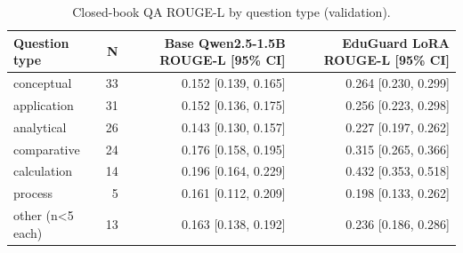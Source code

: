 \begin{table}[t]
\centering
\caption{Closed-book QA ROUGE-L by question type (validation).}
\label{tab:t6_qa_by_type}
\begin{tabular}{lrrr}
\toprule
Question type & N & Base Qwen2.5-1.5B ROUGE-L [95\% CI] & EduGuard LoRA ROUGE-L [95\% CI] \\
\midrule
conceptual & 33 & 0.152 [0.139, 0.165] & 0.264 [0.230, 0.299] \\
application & 31 & 0.152 [0.136, 0.175] & 0.256 [0.223, 0.298] \\
analytical & 26 & 0.143 [0.130, 0.157] & 0.227 [0.197, 0.262] \\
comparative & 24 & 0.176 [0.158, 0.195] & 0.315 [0.265, 0.366] \\
calculation & 14 & 0.196 [0.164, 0.229] & 0.432 [0.353, 0.518] \\
process & 5 & 0.161 [0.112, 0.209] & 0.198 [0.133, 0.262] \\
other (n<5 each) & 13 & 0.163 [0.138, 0.192] & 0.236 [0.186, 0.286] \\
\bottomrule
\end{tabular}
\end{table}
